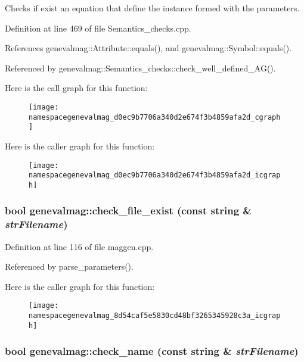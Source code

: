Checks if exist an equation that define the instance formed with the parameters. 

Definition at line 469 of file Semantics\_\-checks.cpp.

References genevalmag::Attribute::equals(), and genevalmag::Symbol::equals().

Referenced by genevalmag::Semantics\_\-checks::check\_\-well\_\-defined\_\-AG().

Here is the call graph for this function:\nopagebreak
\begin{figure}[H]
\begin{center}
\leavevmode
\texttt{[image: namespacegenevalmag\_d0ec9b7706a340d2e674f3b4859afa2d\_cgraph]}
\end{center}
\end{figure}


Here is the caller graph for this function:\nopagebreak
\begin{figure}[H]
\begin{center}
\leavevmode
\texttt{[image: namespacegenevalmag\_d0ec9b7706a340d2e674f3b4859afa2d\_icgraph]}
\end{center}
\end{figure}
\hypertarget{namespacegenevalmag_8d54caf5e5830cd48bf3265345928c3a}{
\subsubsection[{check\_\-file\_\-exist}]{\setlength{\rightskip}{0pt plus 5cm}bool genevalmag::check\_\-file\_\-exist (const string \& {\em strFilename})}}
\label{namespacegenevalmag_8d54caf5e5830cd48bf3265345928c3a}




Definition at line 116 of file maggen.cpp.

Referenced by parse\_\-parameters().

Here is the caller graph for this function:\nopagebreak
\begin{figure}[H]
\begin{center}
\leavevmode
\texttt{[image: namespacegenevalmag\_8d54caf5e5830cd48bf3265345928c3a\_icgraph]}
\end{center}
\end{figure}
\hypertarget{namespacegenevalmag_3bc888ab3b44c41a536427cf386f8c3d}{
\subsubsection[{check\_\-name}]{\setlength{\rightskip}{0pt plus 5cm}bool genevalmag::check\_\-name (const string \& {\em strFilename})}}
\label{namespacegenevalmag_3bc888ab3b44c41a536427cf386f8c3d}




